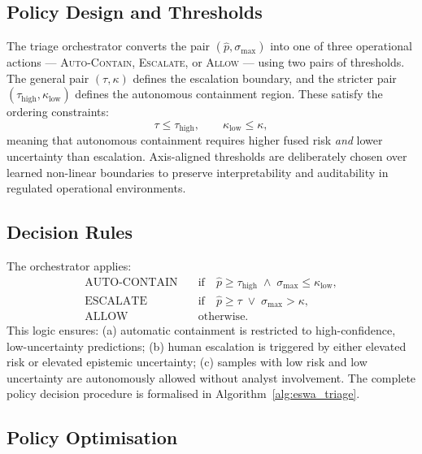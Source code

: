 \subsection{Policy Design and Thresholds}

The triage orchestrator converts the pair $(\hat{p}, \sigma_\text{max})$ into one of three operational actions — \textsc{Auto-Contain}, \textsc{Escalate}, or \textsc{Allow} — using two pairs of thresholds. The general pair $(\tau, \kappa)$ defines the escalation boundary, and the stricter pair $(\tau_\text{high}, \kappa_\text{low})$ defines the autonomous containment region. These satisfy the ordering constraints:
\begin{equation}
\tau \leq \tau_\text{high}, \qquad \kappa_\text{low} \leq \kappa,
\label{eq:eswa_ordering}
\end{equation}
meaning that autonomous containment requires higher fused risk \emph{and} lower uncertainty than escalation. Axis-aligned thresholds are deliberately chosen over learned non-linear boundaries to preserve interpretability and auditability in regulated operational environments.

\subsection{Decision Rules}

The orchestrator applies:
\begin{align}
\text{AUTO-CONTAIN} &\quad \text{if} \quad \hat{p} \geq \tau_\text{high} \;\wedge\; \sigma_\text{max} \leq \kappa_\text{low}, \label{eq:eswa_auto} \\
\text{ESCALATE}     &\quad \text{if} \quad \hat{p} \geq \tau \;\vee\; \sigma_\text{max} > \kappa, \label{eq:eswa_esc} \\
\text{ALLOW}        &\quad \text{otherwise.} \label{eq:eswa_allow}
\end{align}
This logic ensures: (a) automatic containment is restricted to high-confidence, low-uncertainty predictions; (b) human escalation is triggered by either elevated risk or elevated epistemic uncertainty; (c) samples with low risk and low uncertainty are autonomously allowed without analyst involvement. The complete policy decision procedure is formalised in Algorithm~\ref{alg:eswa_triage}.

\subsection{Policy Optimisation}

